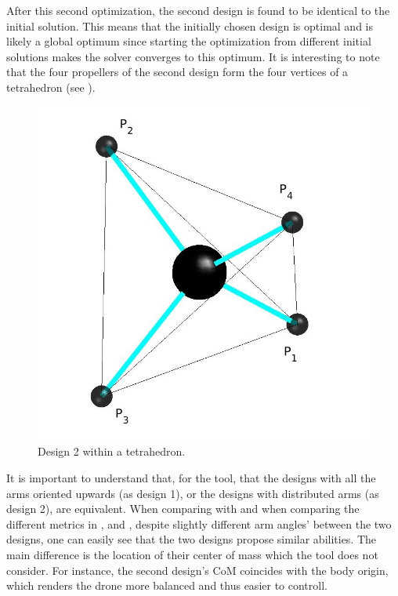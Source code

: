 After this second optimization, the second design is found to be identical to the initial solution.
This means that the initially chosen design is optimal and is likely a global
optimum since starting the optimization from different initial solutions makes the solver
converges to this optimum. It is interesting to note that the four propellers of the second
design form the four vertices of a tetrahedron (see ).\\

\begin{figure}[!ht]
  \centering
  \includegraphics[width=0.35\linewidth]{images/Quad_tetrahedron.jpg}
  \caption{Design 2 within a tetrahedron.}
  \label{fig:Quadcopter_2_tetra}
\end{figure}

It is important to understand that, for the tool, that the designs with all the arms
oriented upwards (as design 1), or the designs with distributed arms (as design 2),
are equivalent. When comparing  with
 and when comparing the different metrics
in ,  and
, despite slightly different arm angles’
between the two designs, one can easily see that the two designs
propose similar abilities. The main difference is the location of their center of mass
which the tool does not consider. For instance, the second design’s CoM coincides with
the body origin, which renders the drone more balanced and thus easier to controll.\\

